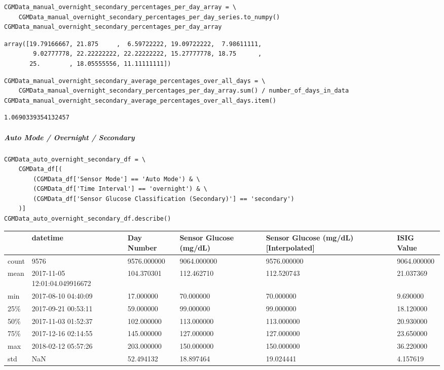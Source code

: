 \begin{verbatim}
CGMData_manual_overnight_secondary_percentages_per_day_array = \
    CGMData_manual_overnight_secondary_percentages_per_day_series.to_numpy()
CGMData_manual_overnight_secondary_percentages_per_day_array
\end{verbatim}

\begin{verbatim}
array([19.79166667, 21.875     ,  6.59722222, 19.09722222,  7.98611111,
        9.02777778, 22.22222222, 22.22222222, 15.27777778, 18.75      ,
       25.        , 18.05555556, 11.11111111])
\end{verbatim}

\begin{verbatim}
CGMData_manual_overnight_secondary_average_percentages_over_all_days = \
    CGMData_manual_overnight_secondary_percentages_per_day_array.sum() / number_of_days_in_data
CGMData_manual_overnight_secondary_average_percentages_over_all_days.item()
\end{verbatim}

\begin{verbatim}
1.0690339354132457
\end{verbatim}

\subparagraph{Auto Mode / Overnight / Secondary}

\begin{verbatim}
CGMData_auto_overnight_secondary_df = \
    CGMData_df[(
        (CGMData_df['Sensor Mode'] == 'Auto Mode') & \
        (CGMData_df['Time Interval'] == 'overnight') & \
        (CGMData_df['Sensor Glucose Classification (Secondary)'] == 'secondary')
    )]
CGMData_auto_overnight_secondary_df.describe()
\end{verbatim}

\bigskip\noindent
\begin{tabular}{p{}p{}p{}p{}p{}p{}}
\toprule
 & datetime & Day Number & Sensor Glucose (mg/dL) & Sensor Glucose (mg/dL) [Interpolated] & ISIG Value \\
\hline
count & 9576 & 9576.000000 & 9064.000000 & 9576.000000 & 9064.000000 \\
\hline
mean & 2017-11-05 12:01:04.049916672 & 104.370301 & 112.462710 & 112.520743 & 21.037369 \\
\hline
min & 2017-08-10 04:40:09 & 17.000000 & 70.000000 & 70.000000 & 9.690000 \\
\hline
25\% & 2017-09-21 00:53:11 & 59.000000 & 99.000000 & 99.000000 & 18.120000 \\
\hline
50\% & 2017-11-03 01:52:37 & 102.000000 & 113.000000 & 113.000000 & 20.930000 \\
\hline
75\% & 2017-12-16 02:14:55 & 145.000000 & 127.000000 & 127.000000 & 23.650000 \\
\hline
max & 2018-02-12 05:57:26 & 203.000000 & 150.000000 & 150.000000 & 36.220000 \\
\hline
std & NaN & 52.494132 & 18.897464 & 19.024441 & 4.157619 \\
\hline
\bottomrule
\end{tabular}

